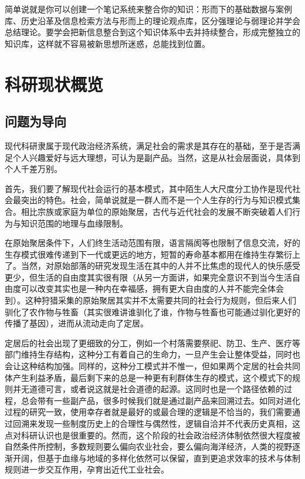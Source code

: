 \documentclass[]{tufte-book}
\begin{document}
简单说就是你可以创建一个笔记系统来整合你的知识：形而下的基础数据与案例库、历史沿革及信息检索方法与形而上的理论观点库，区分强理论与弱理论并学会总结理论。要学会把新信息整合到这个知识体系中去并持续整合，形成完整独立的知识库，这样就不容易被新思想所迷惑，总能找到位置。

\hypertarget{view}{%
\chapter{科研现状概览}\label{view}}

\hypertarget{ux95eeux9898ux4e3aux5bfcux5411}{%
\section{问题为导向}\label{ux95eeux9898ux4e3aux5bfcux5411}}

现代科研隶属于现代政治经济系统，满足社会的需求是其存在的基础，至于是否满足个人兴趣爱好与远大理想，可认为是副产品。当然，这是从社会层面说，具体到个人千差万别。

首先，我们要了解现代社会运行的基本模式，其中陌生人大尺度分工协作是现代社会最突出的特色。社会，简单说就是一群人而不是一个人生存的行为与知识模式集合。相比宗族或家庭为单位的原始聚居，古代与近代社会的发展不断突破着人们行为与知识范围的地理与血缘限制。

在原始聚居条件下，人们终生活动范围有限，语言隔阂等也限制了信息交流，好的生存模式很难传递到下一代或更远的地方，短暂的寿命基本都用在维持生存繁衍上了。当然，对原始部落的研究发现生活在其中的人并不比焦虑的现代人的快乐感受更少，但生活的自由度其实很有限（从另一方面讲，如果完全意识不到当今生活自由度可以改变其实也是一种内在幸福感，拥有更大自由度的人并不能完全体会到）。这种狩猎采集的原始聚居其实并不太需要共同的社会行为规则，但后来人们驯化了农作物与牲畜（其实很难讲谁驯化了谁，作物与牲畜也可能通过驯化更好的传播了基因），进而从流动走向了定居。

定居后的社会出现了更细致的分工，例如一个村落需要祭祀、防卫、生产、医疗等部门维持生存结构，这种分工有着自己的生命力，一旦产生会让整体受益，同时也会让这种结构加强。同样的，这种分工模式并不惟一，但如果两个定居的社会共同体产生利益矛盾，最后剩下来的总是一种更有利群体生存的模式，这个模式下的规则并无道德可言，或者说这就是社会道德的起源。这同时也是一个路径依赖的过程，总会带有一些副产品，很多时候我们就是通过副产品来回溯过去。如同对进化过程的研究一致，使用幸存者就是最好的或最合理的逻辑是不恰当的，我们需要通过回溯来发现一些制度历史上的合理性与偶然性，逻辑自洽并不代表历史真相，这点对科研认识也是很重要的。然而，这个阶段的社会政治经济体制依然很大程度被自然条件所控制，多数规则要么偏向农业社会，要么偏向海洋经济，人类的视野逐渐开阔，但基于血缘与地域的多样化依然可以保留，直到更追求效率的技术与体制规则进一步交互作用，孕育出近代工业社会。
\end{document}
